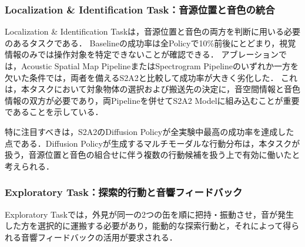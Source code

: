 \documentclass{article}
\begin{document}

\subsubsection{Localization \& Identification Task：音源位置と音色の統合}
	Localization \& Identification Taskは，音源位置と音色の両方を判断に用いる必要のあるタスクである．
	Baselineの成功率は全Policyで10\%前後にとどまり，視覚情報のみでは操作対象を特定できないことが確認できる．
	アブレーションでは，Acoustic Spatial Map PipelineまたはSpectrogram Pipelineのいずれか一方を欠いた条件では，両者を備えるS2A2と比較して成功率が大きく劣化した．
	これは，本タスクにおいて対象物体の選択および搬送先の決定に，音空間情報と音色情報の双方が必要であり，両Pipelineを併せてS2A2 Modelに組み込むことが重要であることを示している．

	特に注目すべきは，S2A2のDiffusion Policyが全実験中最高の成功率を達成した点である．Diffusion Policyが生成するマルチモーダルな行動分布は，本タスクが扱う，音源位置と音色の組合せに伴う複数の行動候補を扱う上で有効に働いたと考えられる．




\subsubsection{Exploratory Task：探索的行動と音響フィードバック}
	Exploratory Taskでは，外見が同一の2つの缶を順に把持・振動させ，音が発生した方を選択的に運搬する必要があり，能動的な探索行動と，それによって得られる音響フィードバックの活用が要求される．
\end{document}
